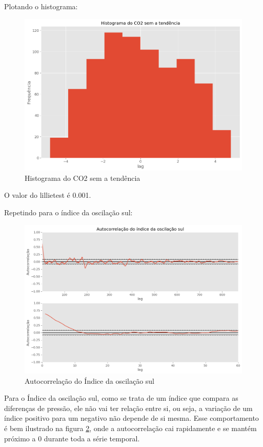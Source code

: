 \documentclass[12pt,a4paper,portuguese]{article}
\begin{document}
Plotando o histograma:
\begin{figure}[H]
	\centering
	\includegraphics[width=1\linewidth]{lista3-6d}
	\caption{Histograma do CO2 sem a tendência}
	\label{fig:lista3-6d}
\end{figure}
O valor do lillietest é 0.001.

Repetindo para o índice da oscilação sul:


\begin{figure}[H]
	\centering
	\includegraphics[width=1\linewidth]{lista3-7}
	\caption{Autocorrelação do Índice da oscilação sul}
	\label{fig:lista3-7}
\end{figure}
Para o Índice da oscilação sul, como se trata de um índice que compara as diferenças de pressão, ele não vai ter relação entre si, ou seja, a variação de um índice positivo para um negativo não depende de si mesma. Esse comportamento é bem ilustrado na figura \ref{fig:lista3-7}, onde a autocorrelação cai rapidamente e se mantém próximo a 0 durante toda a série temporal.
\end{document}
